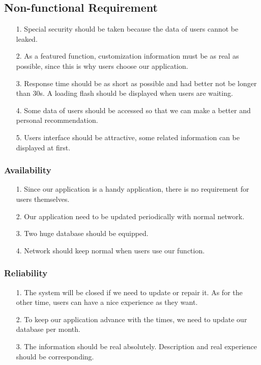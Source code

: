 \documentclass[10pt]{article}
\begin{document}
\subsection{Non-functional Requirement}
\begin{itemize}
	\item[1.]Special security should be taken because the data of users cannot be leaked.
	\item[2.] As a featured function, customization information must be as real as possible, since this is why users choose our application.
	\item[3.]  Response time should be as short as possible and had better not be longer than 30s. A loading flash should be displayed when users are waiting.
	\item[4.] Some data of users should be accessed so that we can make a better and personal recommendation.
	\item[5.]Users interface should be attractive, some related information can be displayed at first.
\end{itemize}

\subsubsection{Availability}
\begin{itemize}
	\item[1.] Since our application is a handy application, there is no requirement for users themselves.
	\item[2.] Our application need to be updated periodically with normal network.
	\item[3.] Two huge database should be equipped.
	\item[4.] Network should keep normal when users use our function.
\end{itemize}

\subsubsection{Reliability}
\begin{itemize}
	\item[1.] The system will be closed if we need to update or repair it. As for the other time, users can have a nice experience as they want. 
	\item[2.]To keep our application advance with the times, we need to update our database per month. 
	\item[3.] The information should be real absolutely. Description and real experience should be corresponding. 
\end{itemize}
\end{document}
